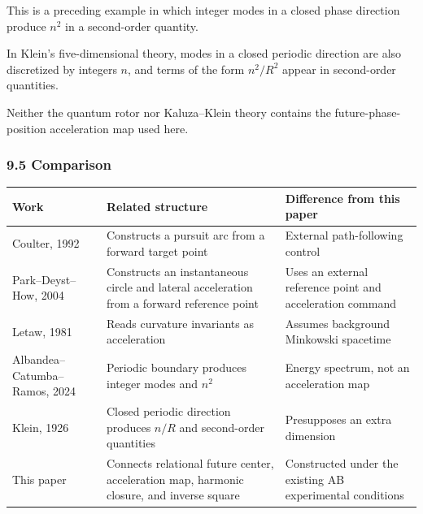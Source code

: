 \documentclass[
  10pt,
  a4paper,
]{article}
\newcounter{none} %
\begin{document}
This is a preceding example in which integer modes in a closed phase
direction produce \(n^2\) in a second-order quantity.

In Klein's five-dimensional theory, modes in a closed periodic direction
are also discretized by integers \(n\), and terms of the form
\(n^2/R^2\) appear in second-order quantities.

Neither the quantum rotor nor Kaluza--Klein theory contains the
future-phase-position acceleration map used here.

\subsubsection{9.5 Comparison}\label{comparison}

{\def\LTcaptype{none} %
\begin{longtable}[]{@{}
  >{\raggedright\arraybackslash}p{}
  >{\raggedright\arraybackslash}p{}
  >{\raggedright\arraybackslash}p{}@{}}
\toprule\noalign{}
\begin{minipage}[b]{\linewidth}\raggedright
Work
\end{minipage} & \begin{minipage}[b]{\linewidth}\raggedright
Related structure
\end{minipage} & \begin{minipage}[b]{\linewidth}\raggedright
Difference from this paper
\end{minipage} \\
\midrule\noalign{}
\endhead
\bottomrule\noalign{}
\endlastfoot
Coulter, 1992 & Constructs a pursuit arc from a forward target point &
External path-following control \\
Park--Deyst--How, 2004 & Constructs an instantaneous circle and lateral
acceleration from a forward reference point & Uses an external reference
point and acceleration command \\
Letaw, 1981 & Reads curvature invariants as acceleration & Assumes
background Minkowski spacetime \\
Albandea--Catumba--Ramos, 2024 & Periodic boundary produces integer
modes and \(n^2\) & Energy spectrum, not an acceleration map \\
Klein, 1926 & Closed periodic direction produces \(n/R\) and
second-order quantities & Presupposes an extra dimension \\
This paper & Connects relational future center, acceleration map,
harmonic closure, and inverse square & Constructed under the existing AB
experimental conditions \\
\end{longtable}
}
\end{document}
